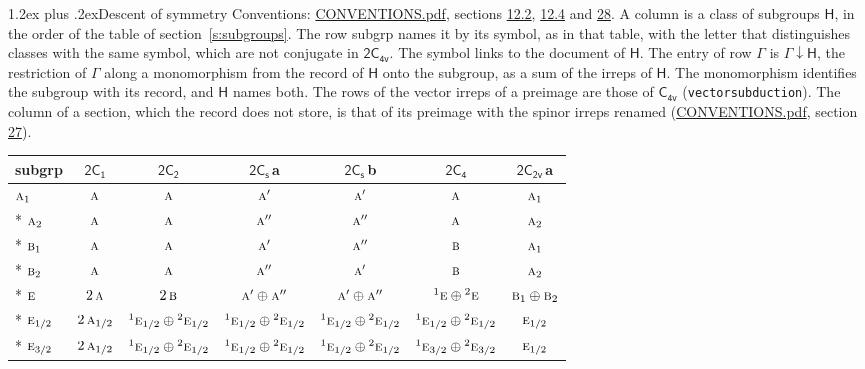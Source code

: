\documentclass[10pt,a4paper]{article}
\makeatletter
\renewcommand\section{\@startsection{section}{1}{\z@}{-3ex plus -1ex minus -.2ex}%
  {1.2ex plus .2ex}{\normalfont\large\sffamily\bfseries\color{parttitle}}}
\numberwithin{equation}{section}
\newcommand{\grp}[1]{\mathsf{#1}}
\newcommand{\irr}[1]{\text{\normalfont\scshape #1}}
\newcommand{\conjpair}[1]{{}^{#1}}
\newcommand{\clsletter}[1]{\,{\scriptsize\color{black!55}#1}}
\newcommand{\restr}[2]{#1\!\downarrow#2}
\makeatother
\begin{document}
\section{Descent of symmetry}\label{s:subduction}
Conventions: \href{../../CONVENTIONS.pdf}{CONVENTIONS.pdf}, sections \href{../../../rotation/CONVENTIONS.pdf\#conv.12.2}{12.2}, \href{../../../rotation/CONVENTIONS.pdf\#conv.12.4}{12.4} and \href{../../CONVENTIONS.pdf\#conv.28}{28}.
A column is a class of subgroups $\grp{H}$, in the order of the table of section~\ref{s:subgroups}. The row subgrp names it by its symbol, as in that table, with the letter that distinguishes classes with the same symbol, which are not conjugate in $\grp{2C_{4v}}$. The symbol links to the document of $\grp{H}$. The entry of row $\Gamma$ is $\restr{\Gamma}{\grp{H}}$, the restriction of $\Gamma$ along a monomorphism from the record of $\grp{H}$ onto the subgroup, as a sum of the irreps of $\grp{H}$. The monomorphism identifies the subgroup with its record, and $\grp{H}$ names both. The rows of the vector irreps of a preimage are those of \href{../../../rotation/data/pdf/C4v.pdf}{$\grp{C_{4v}}$} (\texttt{vectorsubduction}). The column of a section, which the record does not store, is that of its preimage with the spinor irreps renamed (\href{../../CONVENTIONS.pdf}{CONVENTIONS.pdf}, section \href{../../CONVENTIONS.pdf\#conv.27}{27}).
{\small\begin{longtable}{@{}lcccccc@{}}\toprule
subgrp & \href{2C1.pdf}{$\grp{2C_{1}}$} & \href{2C2.pdf}{$\grp{2C_{2}}$} & \href{2C1v.pdf}{$\grp{2C_{s}}$}\clsletter{a} & \href{2C1v.pdf}{$\grp{2C_{s}}$}\clsletter{b} & \href{2C4.pdf}{$\grp{2C_{4}}$} & \href{2C2v.pdf}{$\grp{2C_{2v}}$}\clsletter{a}\\\midrule\endhead
\bottomrule\endfoot\endlastfoot
$\irr{a}_{1}$ & $\irr{a}$ & $\irr{a}$ & $\irr{a}'$ & $\irr{a}'$ & $\irr{a}$ & $\irr{a}_{1}$\\*
$\irr{a}_{2}$ & $\irr{a}$ & $\irr{a}$ & $\irr{a}''$ & $\irr{a}''$ & $\irr{a}$ & $\irr{a}_{2}$\\*
$\irr{b}_{1}$ & $\irr{a}$ & $\irr{a}$ & $\irr{a}'$ & $\irr{a}''$ & $\irr{b}$ & $\irr{a}_{1}$\\*
$\irr{b}_{2}$ & $\irr{a}$ & $\irr{a}$ & $\irr{a}''$ & $\irr{a}'$ & $\irr{b}$ & $\irr{a}_{2}$\\*
$\irr{e}$ & $2\,\irr{a}$ & $2\,\irr{b}$ & $\irr{a}'\oplus \irr{a}''$ & $\irr{a}'\oplus \irr{a}''$ & $\conjpair{1}\irr{e}\oplus \conjpair{2}\irr{e}$ & $\irr{b}_{1}\oplus \irr{b}_{2}$\\*
$\irr{e}_{1/2}$ & $2\,\irr{a}_{1/2}$ & $\conjpair{1}\irr{e}_{1/2}\oplus \conjpair{2}\irr{e}_{1/2}$ & $\conjpair{1}\irr{e}_{1/2}\oplus \conjpair{2}\irr{e}_{1/2}$ & $\conjpair{1}\irr{e}_{1/2}\oplus \conjpair{2}\irr{e}_{1/2}$ & $\conjpair{1}\irr{e}_{1/2}\oplus \conjpair{2}\irr{e}_{1/2}$ & $\irr{e}_{1/2}$\\*
$\irr{e}_{3/2}$ & $2\,\irr{a}_{1/2}$ & $\conjpair{1}\irr{e}_{1/2}\oplus \conjpair{2}\irr{e}_{1/2}$ & $\conjpair{1}\irr{e}_{1/2}\oplus \conjpair{2}\irr{e}_{1/2}$ & $\conjpair{1}\irr{e}_{1/2}\oplus \conjpair{2}\irr{e}_{1/2}$ & $\conjpair{1}\irr{e}_{3/2}\oplus \conjpair{2}\irr{e}_{3/2}$ & $\irr{e}_{1/2}$\\
\bottomrule\end{longtable}}
\end{document}
